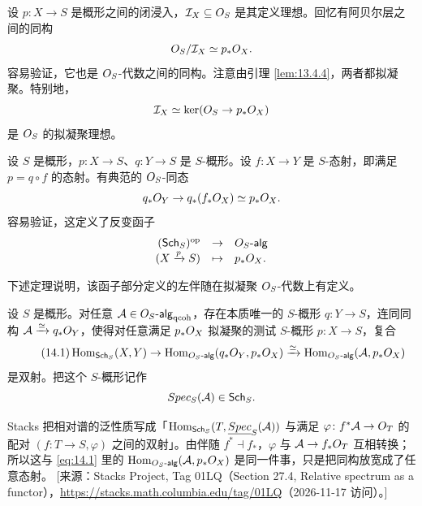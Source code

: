 \begin{example}\label{ex:14.2.2}
设 $p\colon X\to S$ 是概形之间的闭浸入，$\mathcal{I}_X\subseteq O_S$ 是其定义理想。回忆有阿贝尔层之间的同构
\[
O_S/\mathcal{I}_X\simeq p_*O_X.
\]
容易验证，它也是 $O_S$-代数之间的同构。注意由引理 \ref{lem:13.4.4}，两者都拟凝聚。特别地，
\[
\mathcal{I}_X\simeq\ker(O_S\to p_*O_X)
\]
是 $O_S$ 的拟凝聚理想。
\end{example}

\begin{construction}\label{con:14.2.3}
设 $S$ 是概形，$p\colon X\to S$、$q\colon Y\to S$ 是 $S$-概形。设 $f\colon X\to Y$ 是 $S$-态射，即满足 $p=q\circ f$ 的态射。有典范的 $O_S$-同态
\[
q_*O_Y\to q_*(f_*O_X)\simeq p_*O_X.
\]
容易验证，这定义了反变函子
\[
\begin{array}{rcl}
(\mathsf{Sch}_S)^{\mathrm{op}} & \to & O_S\text{-}\mathsf{alg}\\
(X\xrightarrow{p}S) & \mapsto & p_*O_X.
\end{array}
\]
\end{construction}

下述定理说明，该函子部分定义的左伴随在拟凝聚 $O_S$-代数上有定义。

\begin{theorem}\label{thm:14.2.4}
设 $S$ 是概形。对任意 $\mathcal{A}\in O_S\text{-}\mathsf{alg}_{\mathrm{qcoh}}$，存在本质唯一的 $S$-概形 $q\colon Y\to S$，连同同构 $\mathcal{A}\xrightarrow{\simeq}q_*O_Y$，使得对任意满足 $p_*O_X$ 拟凝聚的测试 $S$-概形 $p\colon X\to S$，复合
\begin{equation}\tag{14.1}\label{eq:14.1}
\operatorname{Hom}_{\mathsf{Sch}_S}(X,Y)\to\operatorname{Hom}_{O_S\text{-}\mathsf{alg}}(q_*O_Y,p_*O_X)\xrightarrow{\simeq}\operatorname{Hom}_{O_S\text{-}\mathsf{alg}}(\mathcal{A},p_*O_X)
\end{equation}
是双射。把这个 $S$-概形记作
\[
Spec_S(\mathcal{A})\in\mathsf{Sch}_S.
\]
\end{theorem}

\begin{yizhu}
Stacks 把相对谱的泛性质写成「$\operatorname{Hom}_{\mathsf{Sch}_S}(T,\underline{Spec}_S(\mathcal{A}))$ 与满足 $\varphi\colon f^*\mathcal{A}\to O_T$ 的配对 $(f\colon T\to S,\varphi)$ 之间的双射」。由伴随 $f^*\dashv f_*$，$\varphi$ 与 $\mathcal{A}\to f_*O_T$ 互相转换；所以这与 \eqref{eq:14.1} 里的 $\operatorname{Hom}_{O_S\text{-}\mathsf{alg}}(\mathcal{A},p_*O_X)$ 是同一件事，只是把同构放宽成了任意态射。
[来源：Stacks Project, Tag 01LQ（Section 27.4, Relative spectrum as a functor），\url{https://stacks.math.columbia.edu/tag/01LQ}（2026-11-17 访问）。]
\end{yizhu}

